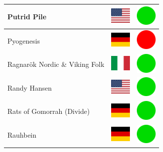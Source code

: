 \documentclass[12pt, a4paper, twoside]{report}
\begin{document}
\begin{center}
\begin{longtable}{|p{5cm}|p{2cm}|p{2cm}|}
 Putrid Pile                                                & \includegraphics[width=1cm]{4x3/us} &   \includegraphics[width=1cm]{likes/y} \\ \hline
 Pyogenesis                                                 & \includegraphics[width=1cm]{4x3/de} &   \includegraphics[width=1cm]{likes/n} \\ \hline
 Ragnarök Nordic \& Viking Folk                             & \includegraphics[width=1cm]{4x3/it} &   \includegraphics[width=1cm]{likes/y} \\ \hline
 Randy Hansen                                               & \includegraphics[width=1cm]{4x3/us} &   \includegraphics[width=1cm]{likes/y} \\ \hline
 Rats of Gomorrah (Divide)                                  & \includegraphics[width=1cm]{4x3/de} &   \includegraphics[width=1cm]{likes/y} \\ \hline
 Rauhbein                                                   & \includegraphics[width=1cm]{4x3/de} &   \includegraphics[width=1cm]{likes/y} \\ \hline

\end{longtable}
\end{center}
\end{document}
